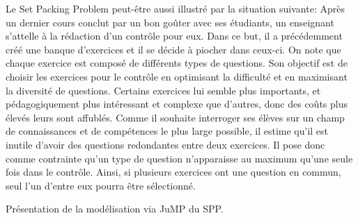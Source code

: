 Le Set Packing Problem peut-être aussi illustré par la situation suivante: 
Après un dernier cours conclut par un bon goûter avec ses étudiants, un enseignant s'attelle à la rédaction d'un contrôle pour eux. Dans ce but, il a précédemment créé une banque d'exercices et il se décide à piocher dans ceux-ci. On note que chaque exercice est composé de différents types de questions. Son objectif est de choisir les exercices pour le contrôle en optimisant la difficulté et en maximisant la diversité de questions. Certains exercices lui semble plus importants, et pédagogiquement plus intéressant et complexe que d'autres, donc des coûts plus élevés leurs sont affublés. Comme il souhaite interroger ses élèves sur un champ de connaissances et de compétences le plus large possible, il estime qu'il est inutile d'avoir des questions redondantes entre deux exercices. Il pose donc comme contrainte qu'un type de question n'apparaisse au maximum qu'une seule fois dans le contrôle. Ainsi, si plusieurs exercices ont une question en commun, seul l'un d'entre eux pourra être sélectionné.




%
%

\vspace{5mm}
\noindent
{}
\vspace{2mm}

\noindent Présentation de la modélisation via JuMP du SPP.

